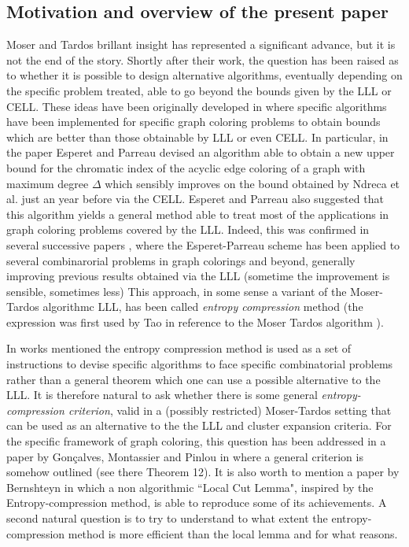 \documentclass[11pt]{article}
\let\D=\Delta \let\F=\Phi \let\G=\Gamma \let\L=\Lambda \let\Th=\Theta
\let\\=\noindent
\begin{document}
\subsection{Motivation and overview of the present paper}
\\Moser and Tardos brillant insight has represented  a significant advance,
but it is not the end of the story.
Shortly after their work, the question has been raised  as to whether it is possible
to design alternative algorithms, eventually
depending on the specific problem treated, able to go beyond  the
bounds given by the LLL or CELL. These ideas have been
originally developed in \cite{DJKW, GKM, EP}  where   specific algorithms
have been
implemented  for  specific graph coloring problems to obtain
bounds which are  better than those  obtainable  by   LLL or even   CELL.
In particular, in the paper \cite{EP} Esperet and
Parreau  devised an algorithm able to obtain
a new upper bound for the chromatic index  of the acyclic edge coloring  of a graph with maximum degree $\D$ which sensibly
improves on the bound obtained by Ndreca et al.  \cite{NPS}  just an year before via the CELL. Esperet and
Parreau
also suggested  that this algorithm   yields a general method able  to treat most of the
applications in graph coloring problems covered by the LLL.
Indeed, this was confirmed in several successive  papers   \cite{GMP,Pr,OP,PSS,CR, CLY,CR,FS, SV}, where the
Esperet-Parreau scheme has been applied to several
combinarorial problems in graph colorings and beyond, generally improving previous results obtained via the LLL
(sometime the improvement is sensible, sometimes less)
This approach, in some sense a variant of the Moser-Tardos algorithmc  LLL, has been called
{\it entropy compression} method (the expression
was first used by Tao  in reference  to the Moser Tardos algorithm \cite{Ta}).

\\In works mentioned
the entropy compression method is used as  a set of instructions to devise   specific algorithms to face  specific combinatorial problems rather
than a general theorem which
one can use a possible alternative  to  the   LLL.
It is therefore  natural   to ask  whether   there is some general  {\it entropy-compression criterion},
valid  in a (possibly restricted) Moser-Tardos setting
that can be used as an alternative to the  the LLL  and  cluster expansion criteria.
For the specific framework of graph coloring, this question has been  addressed
in a paper  by Gon\c{c}alves, Montassier and Pinlou in \cite{GMP}
where  a general criterion is somehow outlined (see there Theorem 12).
It is also worth  to mention a paper by
Bernshteyn  \cite{Be} in which  a non algorithmic ``Local Cut Lemma", inspired by the Entropy-compression method,  is able to
reproduce some of its  achievements.
A second natural question is to try to understand
to what extent the entropy-compression method is more efficient than the local lemma
and for what reasons.
\end{document}
